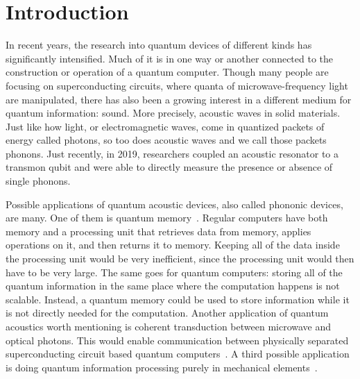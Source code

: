 \chapter{Introduction}


In recent years, the research into quantum devices of different kinds has
significantly intensified.
Much of it is in one way or another connected to the
construction or operation of a quantum computer.
Though many people are focusing on superconducting circuits, where quanta of
microwave-frequency light are manipulated, there has also been
a growing interest in a different medium for quantum information: sound.
More precisely, acoustic waves in solid materials.
Just like how light, or electromagnetic waves, come in quantized packets of energy called
photons,
so too does acoustic waves and we call those packets phonons.
Just recently, in 2019, researchers coupled an acoustic resonator to a transmon
qubit and were able to directly measure the presence or absence of single
phonons.

Possible applications of quantum acoustic devices, also called phononic devices, are many.
One of them is quantum memory~\cite{sete_high-efficiency_2015}.
Regular computers have both memory and a processing unit that
retrieves data from memory, applies operations on it, and then returns it to
memory.
Keeping all of the data inside the processing unit would be very inefficient,
since the processing unit would then have to be very large.
The same goes for quantum computers: storing all of the quantum information in
the same place where the computation happens is not scalable.
Instead, a quantum memory could be used to store information while it is not
directly needed for the computation.
Another application of quantum acoustics worth mentioning is
coherent transduction between microwave and optical photons.
This would enable communication between physically separated superconducting
circuit based quantum computers~\cite{laer_controlling_2019}.
A third possible application is doing quantum information processing purely in
mechanical elements~\cite{qiao2023developing}.

